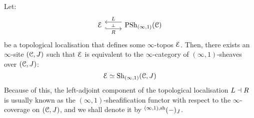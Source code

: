                 \begin{corollary} \label{coro: infinity_topoi_are_sheaf_topoi}
                    Let:
                        $$
                            \begin{tikzcd}
                            	\E & \Psh_{(\infty, 1)}(\C)
                            	\arrow[""{name=0, anchor=center, inner sep=0}, "L"', shift right=2, from=1-2, to=1-1]
                            	\arrow[""{name=1, anchor=center, inner sep=0}, "R"', shift right=2, hook, from=1-1, to=1-2]
                            	\arrow["\dashv"{anchor=center, rotate=-90}, draw=none, from=0, to=1]
                            \end{tikzcd}
                        $$
                    be a topological localisation that defines some $\infty$-topos $\mathcal{E}$. Then, there exists an $\infty$-site $(\mathcal{C}, J)$ such that $\mathcal{E}$ is equivalent to the $\infty$-category of $(\infty, 1)$-sheaves over $(\mathcal{C}, J)$:
                        $$\mathcal{E} \simeq \mathrm{Sh}_{(\infty, 1)}(\mathcal{C}, J)$$
                    Because of this, the left-adjoint component of the topological localisation $L \dashv R$ is usually known as the $(\infty, 1)$-sheafification functor with respect to the $\infty$-coverage on $(\mathcal{C}, J)$, and we shall denote it by ${}^{(\infty, 1), \mathrm{sh}}(-)_J$.
                \end{corollary}
            
